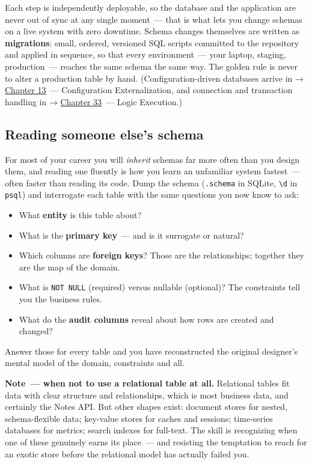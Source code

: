 \noindent{}Each step is independently deployable, so the database and the application are never out of sync at any single moment~--- that is what lets you change schemas on a live system with zero downtime. Schema changes themselves are written as \textbf{migrations}: small, ordered, versioned SQL scripts committed to the repository and applied in sequence, so that every environment~--- your laptop, staging, production~--- reaches the same schema the same way. The golden rule is never to alter a production table by hand. (Configuration-driven databases arrive in → \hyperref[ch:13-configuration-externalization]{Chapter 13}~--- Configuration Externalization, and connection and transaction handling in → \hyperref[ch:33-logic-execution]{Chapter 33}~--- Logic Execution.)

\subsection*{Reading someone else's schema}\label{06-local-dependencies:reading-someone-elses-schema}

For most of your career you will \emph{inherit} schemas far more often than you design them, and reading one fluently is how you learn an unfamiliar system fastest~--- often faster than reading its code. Dump the schema (\texttt{.schema} in SQLite, \texttt{\textbackslash{}d} in \texttt{psql}) and interrogate each table with the same questions you now know to ask:

\begin{itemize}
\tightlist
\item
  What \textbf{entity} is this table about?
\item
  What is the \textbf{primary key}~--- and is it surrogate or natural?
\item
  Which columns are \textbf{foreign keys}? Those are the relationships; together they are the map of the domain.
\item
  What is \texttt{NOT\ NULL} (required) versus nullable (optional)? The constraints tell you the business rules.
\item
  What do the \textbf{audit columns} reveal about how rows are created and changed?
\end{itemize}

\noindent{}Answer those for every table and you have reconstructed the original designer's mental model of the domain, constraints and all.

\begin{notebox}

\textbf{Note~--- when not to use a relational table at all.} Relational tables fit data with clear structure and relationships, which is most business data, and certainly the Notes API. But other shapes exist: document stores for nested, schema-flexible data; key-value stores for caches and sessions; time-series databases for metrics; search indexes for full-text. The skill is recognizing when one of these genuinely earns its place~--- and resisting the temptation to reach for an exotic store before the relational model has actually failed you.

\end{notebox}

